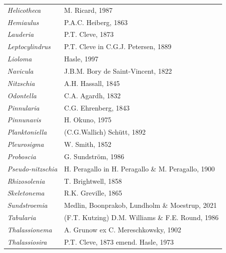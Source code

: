 \documentclass[]{agujournal2019}
\begin{document}
\begin{table}
{\begin{tabular}{@{}ll@{}}
\textit{Helicotheca}       & M. Ricard, 1987                                            \\
\textit{Hemiaulus}         & P.A.C. Heiberg, 1863                                       \\
\textit{Lauderia}          & P.T. Cleve, 1873                                           \\
\textit{Leptocylindrus}    & P.T. Cleve in C.G.J. Petersen, 1889                        \\
\textit{Lioloma}           & Hasle, 1997                                                \\
\textit{Navicula}          & J.B.M. Bory de Saint-Vincent, 1822                         \\
\textit{Nitzschia}         & A.H. Hassall, 1845                                         \\
\textit{Odontella}         & C.A. Agardh, 1832                                          \\
\textit{Pinnularia}        & C.G. Ehrenberg, 1843                                       \\
\textit{Pinnunavis}        & H. Okuno, 1975                                             \\
\textit{Planktoniella}     & (C.G.Wallich) Schütt, 1892                                 \\
\textit{Pleurosigma}       & W. Smith, 1852                                             \\
\textit{Proboscia}         & G. Sundström, 1986                                         \\
\textit{Pseudo-nitzschia}  & H. Peragallo in H. Peragallo \& M. Peragallo, 1900         \\
\textit{Rhizosolenia}      & T. Brightwell, 1858                                        \\
\textit{Skeletonema}       & R.K. Greville, 1865                                        \\
\textit{Sundstroemia}      & Medlin, Boonprakob, Lundholm \& Moestrup, 2021             \\
\textit{Tabularia}         & (F.T. Kutzing) D.M. Williams \& F.E. Round, 1986           \\
\textit{Thalassionema}     & A. Grunow ex C. Mereschkowsky, 1902                        \\
\textit{Thalassiosira}     & P.T. Cleve, 1873 emend. Hasle, 1973                        \\

\end{tabular}}
\end{table}
\end{document}
